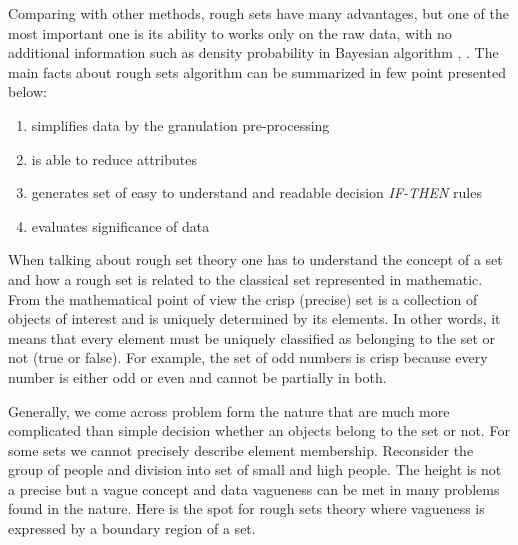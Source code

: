 Comparing with other methods, rough sets have many advantages, but one of the most important
one is its ability to works only on the raw data, with no additional information such 
as density probability in Bayesian algorithm \cite{bib38}, \cite{bib14}. The main facts about rough sets
algorithm can be summarized in few point presented below:
\begin{enumerate}
    \item simplifies data by the granulation pre-processing
    \item is able to reduce attributes
    \item generates set of easy to understand and readable decision
        \textit{IF-THEN} rules
    \item evaluates significance of data 
\end{enumerate}

When talking about rough set theory one has to understand the concept of a set 
and how a rough set is related to the classical set represented in mathematic.
From the mathematical point of view the crisp (precise) set is a collection of 
objects of interest and is uniquely determined by its elements. In other words,
it means that every element must be uniquely classified as belonging to the set 
or not (true or false). For example, the set of odd numbers is crisp because every
number is either odd or even and cannot be partially in both. 

Generally, we come across problem form the nature that are much more
complicated than simple decision whether an objects belong to the set or not. 
For some sets we cannot precisely describe element
membership. Reconsider the group of people and division into set of small and
high people. The height is not a precise but a vague concept and data vagueness can 
be met in many problems found in the nature. Here is the spot for rough sets
theory where vagueness is expressed by a boundary region of a set. 


